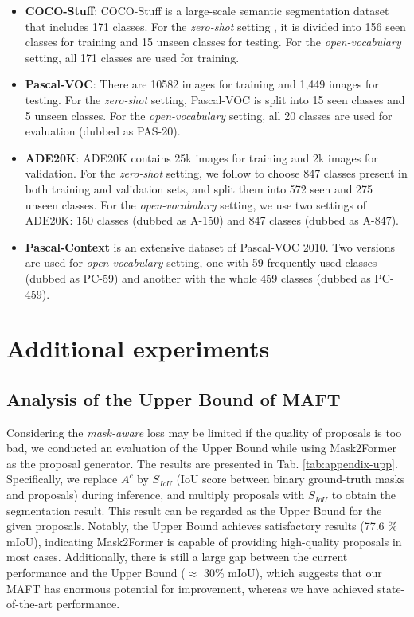 \begin{itemize}[itemsep=2pt,topsep=0pt,parsep=0pt]
\item \textbf{COCO-Stuff}: COCO-Stuff is a large-scale semantic segmentation dataset that includes 171 classes.  For the \textit{zero-shot} setting \cite{zegformer, zsseg, freeseg}, it is divided into 156 seen classes for training and 15 unseen classes for testing. For the \textit{open-vocabulary} setting, all 171 classes are used for training.

\item \textbf{Pascal-VOC}: There are 10582 images for training and 1,449 images for testing. For the \textit{zero-shot} setting, Pascal-VOC is split into 15 seen classes and 5 unseen classes. For the \textit{open-vocabulary} setting, all 20 classes are used for evaluation (dubbed as PAS-20).

\item \textbf{ADE20K}: ADE20K contains 25k images for training and 2k images for validation. For the \textit{zero-shot} setting, we follow \cite{zegformer} to choose 847 classes present in both training and validation sets, and split them into 572 seen and 275 unseen classes. For the \textit{open-vocabulary} setting, we use two settings of ADE20K: 150 classes (dubbed as A-150) and 847 classes (dubbed as A-847).

\item \textbf{Pascal-Context} is an extensive dataset of Pascal-VOC 2010. Two versions are used for \textit{open-vocabulary} setting, one with 59 frequently used classes (dubbed as PC-59) and another with the whole 459 classes (dubbed as PC-459).
\end{itemize}



\section{Additional experiments}
\label{sec:add-exp}

\subsection{Analysis of the Upper Bound of MAFT}


Considering the \textit{mask-aware} loss may be limited if the quality of proposals is too bad, we conducted an evaluation of the Upper Bound while using Mask2Former as the proposal generator. The results are presented in Tab. \ref{tab:appendix-upp}. Specifically, we replace $A^c$ by $S_{IoU}$  (IoU score between binary ground-truth masks and proposals) during inference, and multiply proposals with $S_{IoU}$ to obtain the segmentation result. This result can be regarded as the Upper Bound for the given proposals. Notably, the Upper Bound achieves satisfactory results (77.6 \% mIoU), indicating Mask2Former is capable of providing high-quality proposals in most cases. Additionally, there is still a large gap between the current performance and the Upper Bound ($\approx$ 30\% mIoU), which suggests that our MAFT has enormous potential for improvement, whereas we have achieved state-of-the-art performance.

